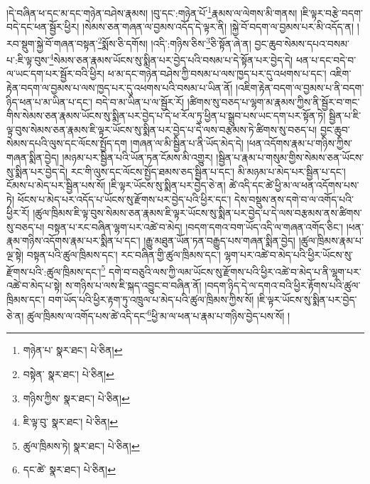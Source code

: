 །དེ་བཞིན་ཕ་དང་མ་དང་གཉེན་བཤེས་རྣམས། །བུ་དང་:གཉེན་པོ་\footnote{གཉེན་པ་  སྣར་ཐང་།  པེ་ཅིན། }རྣམས་ལ་ལེགས་མི་གནས། །ཇི་ལྟར་བརྩེ་བདག་བདེ་དང་ཕན་སྦྱོར་ཕྱིར། །སེམས་ཅན་གཞན་ལ་བྱམས་འདོད་དེ་ལྟར་ནི། །སྐྱེ་བོ་བདག་ལ་བྱམས་པར་མི་འདོད་ན། །རབ་སྡུག་སྐྱེ་བོ་གཞན་བསྟན་\footnote{བསྟེན་  སྣར་ཐང་།  པེ་ཅིན། }སྨོས་ཅི་དགོས། །འདི་:གཉིས་ཅིས་\footnote{གཉིས་ཀྱིས་  སྣར་ཐང་།  པེ་ཅིན། }ཅི་སྟོན་ཞེ་ན། བྱང་ཆུབ་སེམས་དཔའ་བསམ་པ་:ཇི་ལྟ་བུས་\footnote{ཇི་ལྟ་བུ་  སྣར་ཐང་།  པེ་ཅིན། }སེམས་ཅན་རྣམས་ཡོངས་སུ་སྨིན་པར་བྱེད་པའི་བསམ་པ་དེ་སྟོན་པར་བྱེད་དེ། ཕན་པ་དང་བདེ་བ་ལ་ཡང་དག་པར་སྦྱོར་བའི་ཕྱིར། ཕ་མ་དང་གཉེན་བཤེས་ཀྱི་བསམ་པ་ལས་ཁྱད་པར་དུ་འཕགས་པ་དང་། འཇིག་རྟེན་བདག་ལ་བྱམས་པ་ལས་ཁྱད་པར་དུ་འཕགས་པའི་བསམ་པ་ཡིན་ནོ། །འཇིག་རྟེན་བདག་ལ་བྱམས་པ་ནི་བདག་ཉིད་ཕན་པ་མ་ཡིན་པ་དང་། བདེ་བ་མ་ཡིན་པ་ལ་སྦྱོར་རོ། །ཚིགས་སུ་བཅད་པ་ལྷག་མ་རྣམས་ཀྱིས་ནི་སྦྱོར་བ་གང་གིས་སེམས་ཅན་རྣམས་ཡོངས་སུ་སྨིན་པར་བྱེད་པ་དེ་ཕ་རོལ་ཏུ་ཕྱིན་པ་སྒྲུབ་པས་ཡང་དག་པར་སྟོན་ཏེ། སྦྱིན་པ་ཇི་ལྟ་བུས་སེམས་ཅན་རྣམས་ཇི་ལྟར་ཡོངས་སུ་སྨིན་པར་བྱེད་པ་དེ་ལས་བརྩམས་ཏེ་ཚིགས་སུ་བཅད་པ། བྱང་ཆུབ་སེམས་དཔའི་ལུས་དང་ལོངས་སྤྱོད་དག །གཞན་ལ་མི་སྦྱིན་པ་ནི་ཡོད་མེད་དེ། །ཕན་འདོགས་རྣམ་པ་གཉིས་ཀྱིས་གཞན་སྨིན་བྱེད། །མཉམ་པར་སྦྱིན་པའི་ཡོན་ཏན་ངོམས་མི་འགྱུར། །སྦྱིན་པ་རྣམ་པ་གསུམ་གྱིས་སེམས་ཅན་ཡོངས་སུ་སྨིན་པར་བྱེད་དེ། རང་གི་ལུས་དང་ལོངས་སྤྱོད་ཐམས་ཅད་སྦྱིན་པ་དང་། མི་མཉམ་པ་མེད་པར་སྦྱིན་པ་དང་། ངོམས་པ་མེད་པར་སྦྱིན་པས་སོ། །ཇི་ལྟར་ཡོངས་སུ་སྨིན་པར་བྱེད་ཅེ་ན། ཚེ་འདི་དང་ཚེ་ཕྱི་མ་ལ་ཕན་འདོགས་པས་ཏེ། ཕོངས་པ་མེད་པར་འདོད་པ་ཡོངས་སུ་རྫོགས་པར་བྱེད་པའི་ཕྱིར་དང་། དེས་བསྡུས་ནས་དགེ་བ་ལ་འགོད་པའི་ཕྱིར་རོ། །ཚུལ་ཁྲིམས་ཇི་ལྟ་བུས་སེམས་ཅན་རྣམས་ཇི་ལྟར་ཡོངས་སུ་སྨིན་པར་བྱེད་པ་དེ་ལས་བརྩམས་ནས་ཚིགས་སུ་བཅད་པ། བསྟན་པ་རང་བཞིན་ལྷག་པར་འཚེ་བ་མེད། །བདག་དགའ་བག་ཡོད་འདི་ལ་གཞན་འགོད་ཅིང་། །ཕན་རྣམ་གཉིས་འདོགས་རྣམ་པར་སྨིན་པ་དང་། །རྒྱུ་མཐུན་ཡོན་ཏན་བརྒྱུད་པས་གཞན་སྨིན་བྱེད། །ཚུལ་ཁྲིམས་རྣམ་པ་ལྔ་སྟེ། བསྟན་པའི་ཚུལ་ཁྲིམས་དང་། རང་བཞིན་གྱི་ཚུལ་ཁྲིམས་དང་། ལྷག་པར་འཚེ་བ་མེད་པའི་ཕྱིར་ཡོངས་སུ་རྫོགས་པའི་:ཚུལ་ཁྲིམས་དང་།\footnote{ཚུལ་ཁྲིམས་ཏེ།  སྣར་ཐང་།  པེ་ཅིན། } དགེ་བ་བཅུའི་ལས་ཀྱི་ལམ་ཡོངས་སུ་རྫོགས་པའི་ཕྱིར་འཚེ་བ་མེད་པ་ནི་ལྷག་པར་འཚེ་བ་མེད་པ་སྟེ། ས་གཉིས་པ་ལས་ཇི་སྐད་འབྱུང་བ་བཞིན་ནོ། །བདག་ཉིད་དེ་ལ་དགའ་བའི་ཕྱིར་རྟོགས་པའི་ཚུལ་ཁྲིམས་དང་། བག་ཡོད་པའི་ཕྱིར་རྟག་ཏུ་འཁྲུལ་པ་མེད་པའི་ཚུལ་ཁྲིམས་ཀྱིས་སོ། །ཇི་ལྟར་ཡོངས་སུ་སྨིན་པར་བྱེད་ཅེ་ན། ཚུལ་ཁྲིམས་ལ་འགོད་པས་ཚེ་འདི་དང་\footnote{དང་ཚེ་  སྣར་ཐང་།  པེ་ཅིན། }ཕྱི་མ་ལ་ཕན་པ་རྣམ་པ་གཉིས་བྱེད་པས་སོ། །
